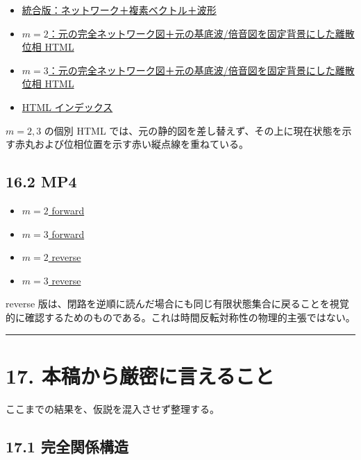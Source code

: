 \documentclass[
  a4paper,
]{ltjsarticle}
\providecommand{\tightlist}{%
  \setlength{\itemsep}{0pt}\setlength{\parskip}{0pt}}
\begin{document}
\begin{itemize}
\tightlist
\item
  \href{K4_harmonic_discrete_phase_animation_20260915.html}{統合版：ネットワーク＋複素ベクトル＋波形}
\item
  \href{K4_network_wave_discrete_m2.html}{\(m=2\)：元の完全ネットワーク図＋元の基底波/倍音図を固定背景にした離散位相
  HTML}
\item
  \href{K4_network_wave_discrete_m3.html}{\(m=3\)：元の完全ネットワーク図＋元の基底波/倍音図を固定背景にした離散位相
  HTML}
\item
  \href{K4_network_wave_index.html}{HTML インデックス}
\end{itemize}

\(m=2,3\) の個別 HTML
では、元の静的図を差し替えず、その上に現在状態を示す赤丸および位相位置を示す赤い縦点線を重ねている。

\subsection{16.2 MP4}\label{mp4}

\begin{itemize}
\tightlist
\item
  \href{K4_harmonic_discrete_phase_m2_20260915.mp4}{\(m=2\) forward}
\item
  \href{K4_harmonic_discrete_phase_m3_20260915.mp4}{\(m=3\) forward}
\item
  \href{K4_harmonic_discrete_phase_m2_reverse_20260915.mp4}{\(m=2\)
  reverse}
\item
  \href{K4_harmonic_discrete_phase_m3_reverse_20260915.mp4}{\(m=3\)
  reverse}
\end{itemize}

reverse
版は、閉路を逆順に読んだ場合にも同じ有限状態集合に戻ることを視覚的に確認するためのものである。これは時間反転対称性の物理的主張ではない。

\begin{center}\rule{0.5\linewidth}{0.5pt}\end{center}

\section{17.
本稿から厳密に言えること}\label{ux672cux7a3fux304bux3089ux53b3ux5bc6ux306bux8a00ux3048ux308bux3053ux3068}

ここまでの結果を、仮説を混入させず整理する。

\subsection{17.1
完全関係構造}\label{ux5b8cux5168ux95a2ux4fc2ux69cbux9020}
\end{document}
